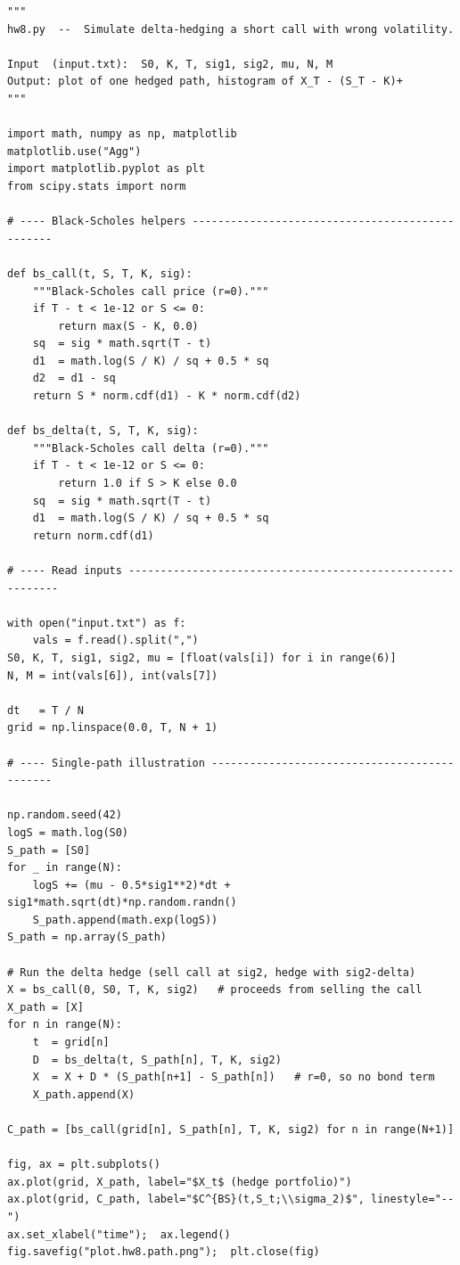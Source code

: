 \documentclass[12pt]{book}
\numberwithin{equation}{chapter}
\theoremstyle{plain}
\numberwithin{theorem}{section}
\theoremstyle{definition}
\numberwithin{exercise}{chapter}
\newcommand{\<}{\langle}
\renewcommand{\>}{\rangle}
\renewcommand{\(}{\left(}
\renewcommand{\)}{\right)}
\renewcommand{\[}{\left[}
\renewcommand{\]}{\right]}
\theoremstyle{definition}
\numberwithin{question}{section}
\begin{document}
\begin{lstlisting}[caption={Delta-hedging with mis-specified volatility (\texttt{hw8.py})}]
"""
hw8.py  --  Simulate delta-hedging a short call with wrong volatility.

Input  (input.txt):  S0, K, T, sig1, sig2, mu, N, M
Output: plot of one hedged path, histogram of X_T - (S_T - K)+
"""

import math, numpy as np, matplotlib
matplotlib.use("Agg")
import matplotlib.pyplot as plt
from scipy.stats import norm

# ---- Black-Scholes helpers ------------------------------------------------

def bs_call(t, S, T, K, sig):
    """Black-Scholes call price (r=0)."""
    if T - t < 1e-12 or S <= 0:
        return max(S - K, 0.0)
    sq  = sig * math.sqrt(T - t)
    d1  = math.log(S / K) / sq + 0.5 * sq
    d2  = d1 - sq
    return S * norm.cdf(d1) - K * norm.cdf(d2)

def bs_delta(t, S, T, K, sig):
    """Black-Scholes call delta (r=0)."""
    if T - t < 1e-12 or S <= 0:
        return 1.0 if S > K else 0.0
    sq  = sig * math.sqrt(T - t)
    d1  = math.log(S / K) / sq + 0.5 * sq
    return norm.cdf(d1)

# ---- Read inputs -----------------------------------------------------------

with open("input.txt") as f:
    vals = f.read().split(",")
S0, K, T, sig1, sig2, mu = [float(vals[i]) for i in range(6)]
N, M = int(vals[6]), int(vals[7])

dt   = T / N
grid = np.linspace(0.0, T, N + 1)

# ---- Single-path illustration ---------------------------------------------

np.random.seed(42)
logS = math.log(S0)
S_path = [S0]
for _ in range(N):
    logS += (mu - 0.5*sig1**2)*dt + sig1*math.sqrt(dt)*np.random.randn()
    S_path.append(math.exp(logS))
S_path = np.array(S_path)

# Run the delta hedge (sell call at sig2, hedge with sig2-delta)
X = bs_call(0, S0, T, K, sig2)   # proceeds from selling the call
X_path = [X]
for n in range(N):
    t  = grid[n]
    D  = bs_delta(t, S_path[n], T, K, sig2)
    X  = X + D * (S_path[n+1] - S_path[n])   # r=0, so no bond term
    X_path.append(X)

C_path = [bs_call(grid[n], S_path[n], T, K, sig2) for n in range(N+1)]

fig, ax = plt.subplots()
ax.plot(grid, X_path, label="$X_t$ (hedge portfolio)")
ax.plot(grid, C_path, label="$C^{BS}(t,S_t;\\sigma_2)$", linestyle="--")
ax.set_xlabel("time");  ax.legend()
fig.savefig("plot.hw8.path.png");  plt.close(fig)


\end{lstlisting}
\end{document}
